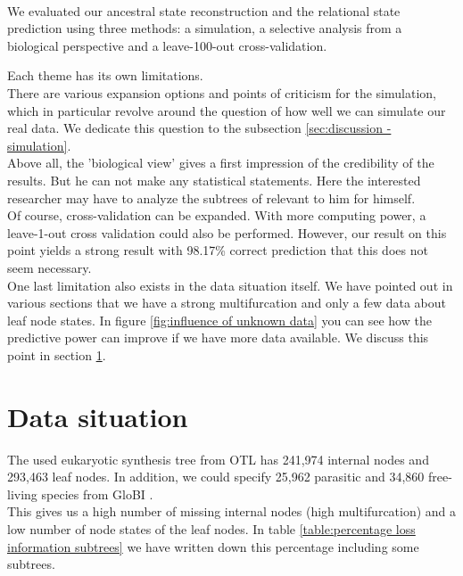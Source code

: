    \\
  
  We evaluated our ancestral state reconstruction and the relational state prediction using three 
    methods: a simulation, a selective analysis from a biological perspective and a leave-100-out 
    cross-validation.
  
  Each theme has its own limitations. \\
  There are various expansion options and points of criticism for the simulation, which in 
    particular revolve around the question of how well we can simulate our real data. We dedicate 
    this question to the subsection \ref{sec:discussion - simulation}. \\
  Above all, the 'biological view' gives a first impression of the credibility of the results. But 
    he can not make any statistical statements. Here the interested researcher may have to analyze 
    the subtrees of relevant to him for himself. \\
   Of course, cross-validation can be expanded. With more computing power, a leave-1-out cross 
    validation could also be performed. However, our result on this point yields a strong result 
    with 98.17\% correct prediction that this does not seem necessary. \\
  One last limitation also exists in the data situation itself. We have pointed out in various 
    sections that we have a strong multifurcation and only a few data about leaf node states. In 
    figure \ref{fig:influence of unknown data} you can see how the predictive power can improve if 
    we have more data available. We discuss this point in section 
    \ref{sec:discussion - data situation}.


  \section{Data situation} \label{sec:discussion - data situation}
    The used eukaryotic synthesis tree from OTL \cite{Hinchliff2015} has 241,974 internal nodes and 
      293,463 leaf nodes. In addition, we could specify 25,962 parasitic and 34,860 free-living 
      species from GloBI \cite{Poelen2014}. \\
    This gives us a high number of missing internal nodes (high multifurcation) and a low number of 
      node states of the leaf nodes. In table \ref{table:percentage loss information subtrees} we have 
      written down this percentage including some subtrees. \\

